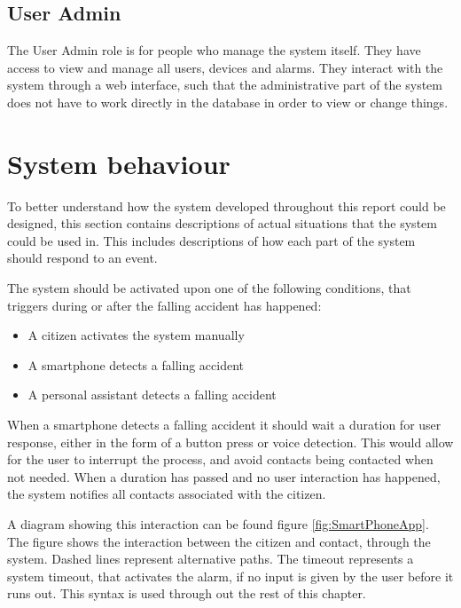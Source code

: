 \subsection{User Admin}
The User Admin role is for people who manage the system itself. They have access to view and manage all users, devices and alarms. They interact with the system through a web interface, such that the administrative part of the system does not have to work directly in the database in order to view or change things.

\section{System behaviour}\label{sec:system-behaviour}
To better understand how the system developed throughout this report could be designed, this section contains descriptions of actual situations that the system could be used in. This includes descriptions of how each part of the system should respond to an event.

The system should be activated upon one of the following conditions, that triggers during or after the falling accident has happened:

\begin{itemize}
    \item A citizen activates the system manually
    \item A smartphone detects a falling accident
    \item A personal assistant detects a falling accident
\end{itemize}

When a smartphone detects a falling accident it should wait a duration for user response, either in the form of a button press or voice detection. This would allow for the user to interrupt the process, and avoid contacts being contacted when not needed. When a duration has passed and no user interaction has happened, the system notifies all contacts associated with the citizen.

A diagram showing this interaction can be found figure \ref{fig:SmartPhoneApp}. The figure shows the interaction between the citizen and contact, through the system. Dashed lines represent alternative paths. The timeout represents a system timeout, that activates the alarm, if no input is given by the user before it runs out. This syntax is used through out the rest of this chapter.

